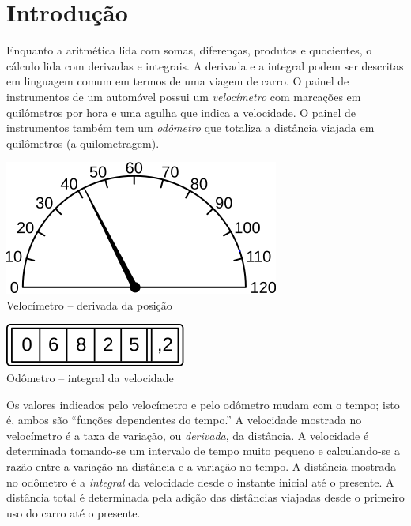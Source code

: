 \graphicspath{ {./figuras/00_intro/} }
\chapter*{Introdução}

Enquanto a aritmética lida com somas, diferenças, produtos e quocientes, o
cálculo lida com derivadas e integrais. A derivada e a integral podem
ser descritas em linguagem comum em termos de uma viagem de carro. O
painel de instrumentos de um automóvel possui um \emph{velocímetro}
com marcações em quilômetros por hora e uma agulha que indica a velocidade.
O painel de instrumentos também tem um \emph{odômetro} que totaliza a
distância viajada em quilômetros (a quilometragem).

\vspace{0.5\baselineskip}
\begin{minipage}{0.5\textwidth}
\begin{center}
\includegraphics{velocimetro}\\
Velocímetro -- derivada da posição
\end{center}
\end{minipage}%
\begin{minipage}{0.5\textwidth}
\begin{center}
\includegraphics{odometro}\\
Odômetro -- integral da velocidade
\end{center}
\end{minipage}
\vspace{0.5\baselineskip}

Os valores indicados pelo velocímetro e pelo odômetro mudam com o tempo;
isto é, ambos são ``funções dependentes do tempo.'' A velocidade mostrada
no velocímetro é a taxa de variação, ou \emph{derivada}, da distância.
A velocidade é determinada tomando-se um intervalo de tempo muito
pequeno e calculando-se a razão entre a variação na distância e a
variação no tempo. A distância mostrada no odômetro é a
\emph{integral} da velocidade desde o instante inicial até o presente. 
A distância total é determinada pela adição das distâncias viajadas desde
o primeiro uso do carro até o presente.

